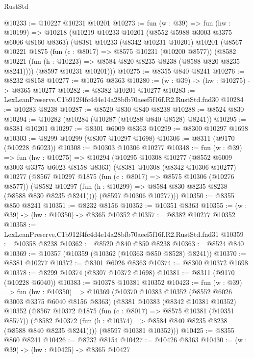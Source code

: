 \begin{lexlean}{RustStd}
\begin{coremodule}
@10233 := @10227 @10231 @10201
@10273 := fun (w : @39) =>
  fun (hw : @10199) =>
  @10218
    (@10219
      @10233
      @10201
      (@8552 @5988 @3003 @3375 @6006 @8160 @8363)
      (@8381
        @10233
        (@8342 @10231 @10201)
        @10201
        (@8567
          @10221
          @1875
          (fun (c : @8017) => @8575 @10231 (@10200 @8577))
          (@8582 @10221 (fun (h : @10223) => @8584 @820 @8235 @8238 (@8588 @820 @8235 @8241))))
        (@8597 @10231 @10201)))
@10275 := @8355 @840 @8241
@10276 := @8232 @8158
@10277 := @10276 @8363
@10280 := (w : @39) -> (hw : @10275) -> @8365 @10277
@10282 := @8382 @10201 @10277
@10283 := LexLeanPreserve.C1b912f4fc4d4e14a28bfb70aeef5f16f.R2.RustStd.fnd30
@10284 := @10283 @8238
@10287 := @8520 @830 @840 @8238
@10288 := @8524 @830
@10294 := @10282 (@10284 (@10287 (@10288 @840 @8528) @8241))
@10295 := @8381 @10201
@10297 := @8301 @6009 @8363
@10299 := @8300 @10297 @1698
@10303 := @8299 @10299 (@8307 @10297 @1698)
@10306 := @8311 (@9170 (@10228 @6023))
@10308 := @10303 @10306 @10277
@10348 := fun (w : @39) =>
  fun (hw : @10275) =>
  @10294
    (@10295
      @10308
      @10277
      (@8552 @6009 @3003 @3375 @6023 @8158 @8363)
      (@8381
        @10308
        (@8342 @10306 @10277)
        @10277
        (@8567
          @10297
          @1875
          (fun (c : @8017) => @8575 @10306 (@10276 @8577))
          (@8582 @10297 (fun (h : @10299) => @8584 @830 @8235 @8238 (@8588 @830 @8235 @8241))))
        (@8597 @10306 @10277)))
@10350 := @8355 @850 @8241
@10351 := @8232 @8156
@10352 := @10351 @8363
@10355 := (w : @39) -> (hw : @10350) -> @8365 @10352
@10357 := @8382 @10277 @10352
@10358 := LexLeanPreserve.C1b912f4fc4d4e14a28bfb70aeef5f16f.R2.RustStd.fnd31
@10359 := @10358 @8238
@10362 := @8520 @840 @850 @8238
@10363 := @8524 @840
@10369 := @10357 (@10359 (@10362 (@10363 @850 @8528) @8241))
@10370 := @8381 @10277
@10372 := @8301 @6026 @8363
@10374 := @8300 @10372 @1698
@10378 := @8299 @10374 (@8307 @10372 @1698)
@10381 := @8311 (@9170 (@10228 @6040))
@10383 := @10378 @10381 @10352
@10423 := fun (w : @39) =>
  fun (hw : @10350) =>
  @10369
    (@10370
      @10383
      @10352
      (@8552 @6026 @3003 @3375 @6040 @8156 @8363)
      (@8381
        @10383
        (@8342 @10381 @10352)
        @10352
        (@8567
          @10372
          @1875
          (fun (c : @8017) => @8575 @10381 (@10351 @8577))
          (@8582 @10372 (fun (h : @10374) => @8584 @840 @8235 @8238 (@8588 @840 @8235 @8241))))
        (@8597 @10381 @10352)))
@10425 := @8355 @860 @8241
@10426 := @8232 @8154
@10427 := @10426 @8363
@10430 := (w : @39) -> (hw : @10425) -> @8365 @10427

\end{coremodule}
\end{lexlean}
